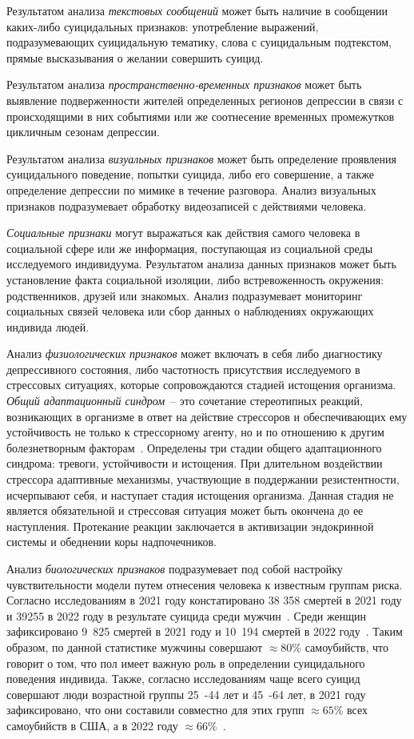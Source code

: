 Результатом анализа  \textit{текстовых сообщений} может быть наличие в сообщении каких-либо суицидальных признаков: употребление выражений, подразумевающих суицидальную тематику, слова с суицидальным подтекстом, прямые высказывания о желании совершить суицид.

Результатом анализа \textit{пространственно-временных признаков} может быть выявление подверженности жителей определенных регионов депрессии в связи с происходящими в них событиями или же соотнесение временных промежутков цикличным сезонам депрессии.

Результатом анализа \textit{визуальных признаков} может быть определение проявления суицидального поведение, попытки суицида, либо его совершение, а также определение депрессии по мимике в течение разговора. Анализ визуальных признаков подразумевает обработку видеозаписей с действиями человека.

\textit{Социальные признаки} могут выражаться как действия самого человека в социальной сфере или же информация, поступающая из социальной среды исследуемого индивидуума. Результатом анализа данных признаков может быть установление факта социальной изоляции, либо встревоженность окружения: родственников, друзей или знакомых. Анализ подразумевает мониторинг социальных связей человека или сбор данных о наблюдениях окружающих индивида людей.

Анализ \textit{физиологических признаков} может включать в себя либо диагностику депрессивного состояния, либо частотность присутствия исследуемого в стрессовых ситуациях, которые сопровождаются стадией истощения организма. \textit{Общий адаптационный синдром}~-- это сочетание стереотипных реакций, возникающих в организме в ответ на действие стрессоров и обеспечивающих ему устойчивость не только к стрессорному агенту, но и по отношению к другим болезнетворным факторам~\cite{stressAndPatology}. Определены три стадии общего адаптационного синдрома: тревоги, устойчивости и истощения. При длительном воздействии стрессора адаптивные механизмы, участвующие в поддержании резистентности, исчерпывают себя, и наступает стадия истощения организма. Данная стадия не является обязательной и стрессовая ситуация может быть окончена до ее наступления. Протекание реакции заключается в активизации эндокринной системы и обеднении коры надпочечников.~\cite{stressAndPatology}

Анализ \textit{биологических признаков} подразумевает под собой настройку чувствительности модели путем отнесения человека к известным группам риска. Согласно исследованиям в 2021 году констатировано 38 358 смертей в 2021 году и 39255 в 2022 году в результате суицида среди мужчин~\cite{suicideStats}. Среди женщин зафиксировано 9~825 смертей в 2021 году и 10~194 смертей в 2022 году~\cite{suicideStats}. Таким образом, по данной статистике мужчины совершают $\approx 80\%$ самоубийств, что говорит о том, что пол имеет важную роль в определении суицидального поведения индивида. Также, согласно исследованиям чаще всего суицид совершают люди возрастной группы 25~-44 лет и 45~-64 лет, в 2021 году зафиксировано, что они составили совместно для этих групп $\approx 65 \%$ всех самоубийств в США, а в 2022 году $\approx 66\%$~\cite{suicideStats}.


